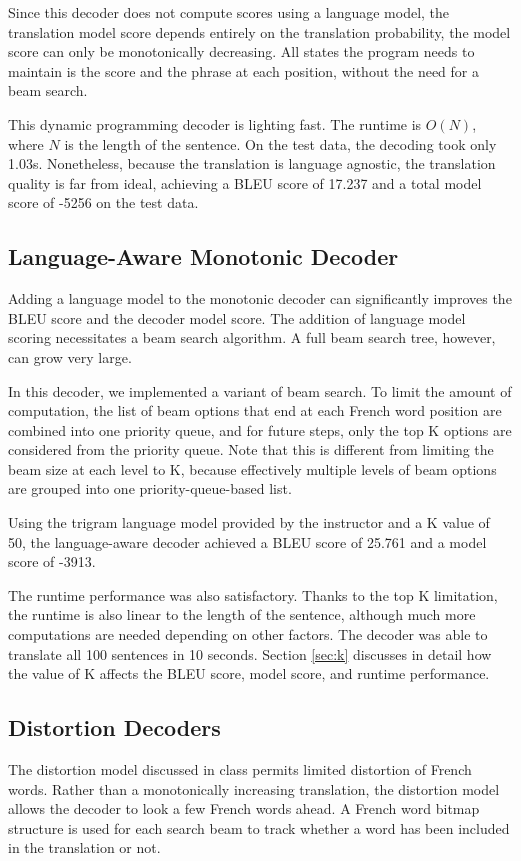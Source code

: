 \documentclass[12pt]{article}   %
\begin{document}
Since this decoder does not compute scores using a language model, the translation model score depends entirely on the translation probability, the model score can only be monotonically decreasing. All states the program needs to maintain is the score and the phrase at each position, without the need for a beam search.

This dynamic programming decoder is lighting fast. The runtime is $O(N)$, where $N$ is the length of the sentence. On the test data, the decoding took only 1.03s. Nonetheless, because the translation is language agnostic, the translation quality is far from ideal, achieving a BLEU score of 17.237 and a total model score of -5256 on the test data.



\subsection{Language-Aware Monotonic Decoder}
Adding a language model to the monotonic decoder can significantly improves the BLEU score and the decoder model score. The addition of language model scoring necessitates a beam search algorithm. A full beam search tree, however, can grow very large.

In this decoder, we implemented a variant of beam search. To limit the amount of computation, the list of beam options that end at each French word position are combined into one priority queue, and for future steps, only the top K options are considered from the priority queue. Note that this is different from limiting the beam size at each level to K, because effectively multiple levels of beam options are grouped into one priority-queue-based list.

 Using the trigram language model provided by the instructor and a K value of 50, the language-aware decoder achieved a BLEU score of 25.761 and a model score of -3913. 

The runtime performance was also satisfactory. Thanks to the top K limitation, the runtime is also linear to the length of the sentence, although much more computations are needed depending on other factors. The decoder was able to translate all 100 sentences in 10 seconds. Section \ref{sec:k} discusses in detail how the value of K affects the BLEU score, model score, and runtime performance.



\subsection{Distortion Decoders}
The distortion model discussed in class permits limited distortion of French words. Rather than a monotonically increasing translation, the distortion model allows the decoder to look a few French words ahead. A French word bitmap structure is used for each search beam to track whether a word has been included in the translation or not.
\end{document}
